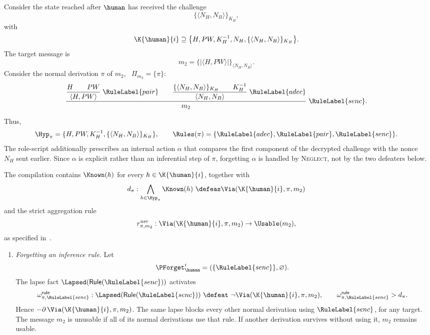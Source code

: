 \begin{example}
\label{Ex:ProceduralForgetting}
Consider the state reached after $\human$ has received the challenge
\[ 
    \{\langle N_H,N_B\rangle\}_{K_H}, 
\]
with
\[ 
    \K{\human}{i}\supseteq\bigl\{H,PW,K_H^{-1},N_H,\{\langle N_H,N_B\rangle\}_{K_H}\bigr\}. 
\]
The target message is
\[ 
    m_2= \{\!|\langle H,PW\rangle|\!\}_{\langle N_H,N_B\rangle}.
\]
Consider the normal derivation $\pi$ of $m_2$, \ $\Pi_{m_2}=\{\pi\}$:
\[
\frac{
    \displaystyle\frac{H\qquad PW}{\langle H,PW\rangle}\;\RuleLabel{pair}
    \qquad
    \displaystyle\frac{
        \{\langle N_H,N_B\rangle\}_{K_H}\qquad K_H^{-1}
    }{\langle N_H,N_B\rangle}\;\RuleLabel{adec}
}{m_2}\;\RuleLabel{senc}.
\]

Thus, 
\[
    \Hyp_\pi=
    \{H,PW,K_H^{-1},\{\langle N_H,N_B\rangle\}_{K_H}\},
    \qquad
    \Rules(\pi)=\{\RuleLabel{adec},\RuleLabel{pair},\RuleLabel{senc}\}.
\]
The role-script additionally prescribes an internal action $\alpha$ that compares the first component of the decrypted challenge with the nonce $N_H$ sent earlier. Since $\alpha$ is explicit rather than an inferential step of $\pi$, forgetting $\alpha$ is handled by \textsc{Neglect}, not by the two defeaters below.

The compilation contains $\Known(h)$ for every $h\in\K{\human}{i}$, together with 
\[
    d_\pi: \bigwedge_{h\in\Hyp_\pi}\Known(h) \ \defeas \Via(\K{\human}{i},\pi,m_2) 
\]
and the strict aggregation rule
\[
    r^{\mathit{use}}_{\pi,m_2}: \Via(\K{\human}{i},\pi,m_2) \to \Usable(m_2),
\]
as specified in~.

\begin{enumerate}
    \item[a.] \emph{Forgetting an inference rule.} Let
    \[
        \PForget_{\human}^{i}
        =(\{\RuleLabel{senc}\},\varnothing).
    \]
    The lapse fact $\Lapsed(\mathsf{Rule}(\RuleLabel{senc}))$ activates
    \[
        \omega^{\mathsf{rule}}_{\pi,\RuleLabel{senc}}:
        \Lapsed(\mathsf{Rule}(\RuleLabel{senc}))
        \ \defeat\ \neg\Via(\K{\human}{i},\pi,m_2),
        \qquad \omega^{\mathsf{rule}}_{\pi,\RuleLabel{senc}}>d_\pi.
    \]
    Hence $-\partial\,\Via(\K{\human}{i},\pi,m_2)$. The same lapse blocks every other normal derivation using $\RuleLabel{senc}$, for any target. The message $m_2$ is unusable if all of its normal derivations use that rule. If another derivation survives without using it, $m_2$ remains usable.


\end{enumerate}
\end{example}
